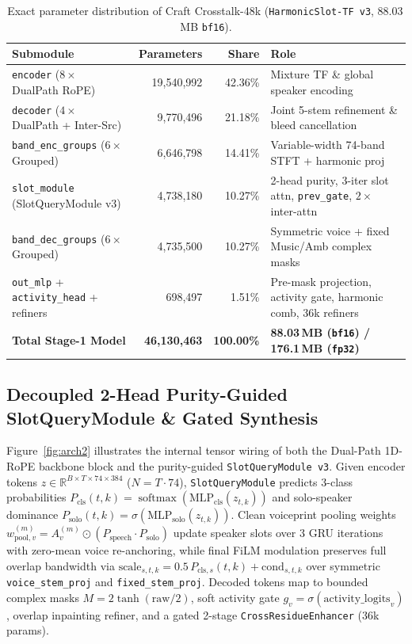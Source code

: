\documentclass[10pt,a4paper]{article}
\begin{document}
\begin{table}[h]
\centering
\caption{Exact parameter distribution of Craft Crosstalk-48k (\texttt{HarmonicSlot-TF v3}, 88.03\,MB \texttt{bf16}).}
\label{tab:params}
\small
\begin{tabular}{lrrl}
\toprule
\textbf{Submodule} & \textbf{Parameters} & \textbf{Share} & \textbf{Role} \\
\midrule
\texttt{encoder} ($8\times$ DualPath RoPE) & 19,540,992 & 42.36\% & Mixture TF \& global speaker encoding \\
\texttt{decoder} ($4\times$ DualPath + Inter-Src) & 9,770,496 & 21.18\% & Joint 5-stem refinement \& bleed cancellation \\
\texttt{band\_enc\_groups} ($6\times$ Grouped) & 6,646,798 & 14.41\% & Variable-width 74-band STFT + harmonic proj \\
\texttt{slot\_module} (SlotQueryModule v3) & 4,738,180 & 10.27\% & 2-head purity, 3-iter slot attn, \texttt{prev\_gate}, $2\times$ inter-attn \\
\texttt{band\_dec\_groups} ($6\times$ Grouped) & 4,735,500 & 10.27\% & Symmetric voice + fixed Music/Amb complex masks \\
\texttt{out\_mlp} + \texttt{activity\_head} + refiners & 698,497 & 1.51\% & Pre-mask projection, activity gate, harmonic comb, 36k refiners \\
\midrule
\textbf{Total Stage-1 Model} & \textbf{46,130,463} & \textbf{100.00\%} & \textbf{88.03\,MB (\texttt{bf16}) / 176.1\,MB (\texttt{fp32})} \\
\bottomrule
\end{tabular}
\end{table}

\subsection{Decoupled 2-Head Purity-Guided SlotQueryModule \& Gated Synthesis}
Figure~\ref{fig:arch2} illustrates the internal tensor wiring of both the Dual-Path 1D-RoPE backbone block and the purity-guided \texttt{SlotQueryModule v3}. Given encoder tokens $z \in \mathbb{R}^{B \times T \times 74 \times 384}$ ($N=T\cdot 74$), \texttt{SlotQueryModule} predicts 3-class probabilities $P_{\text{cls}}(t,k) = \operatorname{softmax}(\text{MLP}_{\text{cls}}(z_{t,k}))$ and solo-speaker dominance $P_{\text{solo}}(t,k) = \sigma(\text{MLP}_{\text{solo}}(z_{t,k}))$. Clean voiceprint pooling weights $w_{\text{pool},v}^{(m)} = A_v^{(m)} \odot (P_{\text{speech}}\cdot P_{\text{solo}})$ update speaker slots over 3 GRU iterations with zero-mean voice re-anchoring, while final FiLM modulation preserves full overlap bandwidth via $\text{scale}_{s,t,k} = 0.5\,P_{\text{cls},s}(t,k) + \text{cond}_{s,t,k}$ over symmetric \texttt{voice\_stem\_proj} and \texttt{fixed\_stem\_proj}. Decoded tokens map to bounded complex masks $M = 2\tanh(\text{raw}/2)$, soft activity gate $g_v = \sigma(\text{activity\_logits}_v)$, overlap inpainting refiner, and a gated 2-stage \texttt{CrossResidueEnhancer} (36k params).
\end{document}
